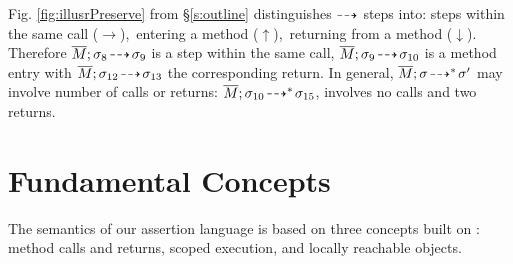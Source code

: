 Fig. \ref{fig:illusrPreserve}  from \S \ref{s:outline} %
distinguishes %
  ${\dashrightarrow}$  steps into: %
steps within the same  call ($\rightarrow$),\   entering a method  ($\uparrow$),\    returning from a method  ($\downarrow$).
Therefore $\overline{M};\sigma_8\! \dashrightarrow\! {\sigma_9} $ is a step within the same call, 
$\overline{M};\sigma_9\! \dashrightarrow\! {\sigma_{10}} $ is a method entry with $\overline{M};\sigma_{12}\! \dashrightarrow\! {\sigma_{13}} $
the corresponding return. 
In general,  $\overline{M};\sigma\! \dashrightarrow^*\! {\sigma'}$ may involve   number of  calls or returns: \eg
$\overline{M};\sigma_{10}\! \dashrightarrow^*\! {\sigma_{15}}$,   involves no calls and two returns.


%
 

\section{Fundamental  Concepts}
\label{s:auxiliary}


The semantics of our assertion language %
is based on three concepts built on \LangOO: method calls and returns, scoped execution, and locally reachable objects. 



